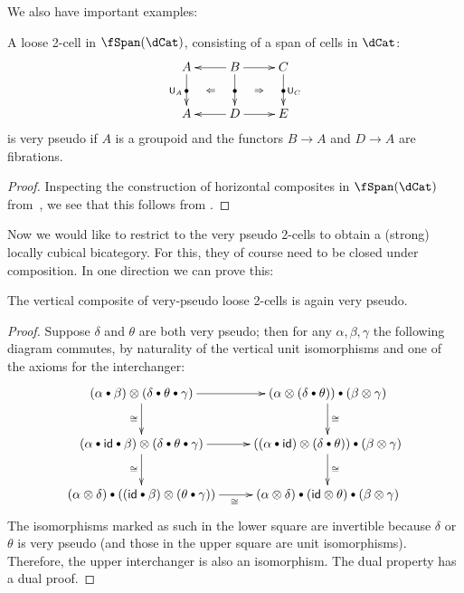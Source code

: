 \documentclass{amsart}
\newcommand{\bcomp}{\mathbin{\raisebox{1pt}{\scriptsize$\bullet$}}}
\let\ocomp\otimes
\newcommand{\hunit}[1]{\mathsf{U}_{#1}}
\renewcommand{\id}{\mathsf{id}}
\begin{document}
We also have important examples:

\begin{lem}\label{thm:gpdfib-vps}
  A loose 2-cell in $\fSpan(\dCat)$, consisting of a span of cells in $\dCat$:
  \[ \xymatrix{ A \ar@{<-}[r] \ar[d]|{\bullet}_{\hunit A} \ar@{}[dr]|{\Leftarrow} & 
    B \ar[r] \ar[d]|{\bullet} \ar@{}[dr]|{\Rightarrow}& 
    C \ar[d]|{\bullet}^{\hunit C} \\
    A \ar@{<-}[r] & D \ar[r] & E } \]
  is very pseudo if $A$ is a groupoid and the functors $B\to A$ and $D\to A$ are fibrations.
\end{lem}
\begin{proof}
  Inspecting the construction of horizontal composites in $\fSpan(\dCat)$ from~\cite[\S6]{gp:intercategories-ii}, we see that this follows from \cite[Proposition 49]{garner:double-clubs}.
\end{proof}

Now we would like to restrict to the very pseudo 2-cells to obtain a (strong) locally cubical bicategory.
For this, they of course need to be closed under composition.
In one direction we can prove this:

\begin{lem}
  The vertical composite of very-pseudo loose 2-cells is again very pseudo.
\end{lem}
\begin{proof}
  Suppose $\delta$ and $\theta$ are both very pseudo; then for any $\alpha,\beta,\gamma$ the following diagram commutes, by naturality of the vertical unit isomorphisms and one of the axioms for the interchanger:
  \[ \xymatrix{
    (\alpha \bcomp \beta) \ocomp (\delta \bcomp \theta \bcomp \gamma) \ar[r] \ar[d]_\cong&
    (\alpha \ocomp (\delta\bcomp\theta)) \bcomp (\beta \ocomp \gamma) \ar[d]^\cong \\
    (\alpha \bcomp \id \bcomp \beta) \ocomp (\delta \bcomp \theta \bcomp \gamma) \ar[r] \ar[d]_\cong&
    ((\alpha \bcomp \id) \ocomp (\delta\bcomp\theta)) \bcomp (\beta \ocomp \gamma) \ar[d]^\cong \\
    (\alpha \ocomp \delta) \bcomp ((\id \bcomp \beta) \ocomp (\theta\bcomp\gamma)) \ar[r]_\cong &
    (\alpha \ocomp \delta) \bcomp (\id \ocomp \theta) \bcomp (\beta\ocomp \gamma) 
  }\]
  The isomorphisms marked as such in the lower square are invertible because $\delta$ or $\theta$ is very pseudo (and those in the upper square are unit isomorphisms).
  Therefore, the upper interchanger is also an isomorphism.
  The dual property has a dual proof.
\end{proof}
\end{document}
